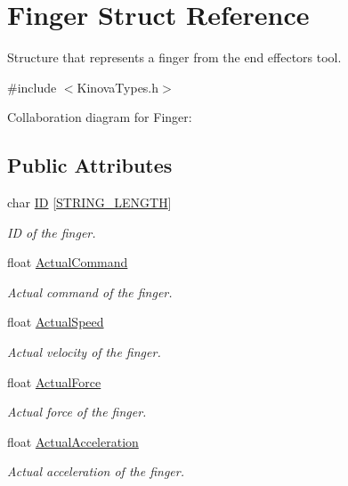 \hypertarget{struct_finger}{}\section{Finger Struct Reference}
\label{struct_finger}


Structure that represents a finger from the end effector\textquotesingle{}s tool.  




{\ttfamily \#include $<$Kinova\+Types.\+h$>$}



Collaboration diagram for Finger\+:
\subsection*{Public Attributes}
\begin{DoxyCompactItemize}
\item 
char \hyperlink{struct_finger_a1e81ad463f71627970a8e6820f789fab}{ID} \mbox{[}\hyperlink{_kinova_types_8h_ac829415013d8120cedee928452ae0f55}{S\+T\+R\+I\+N\+G\+\_\+\+L\+E\+N\+G\+TH}\mbox{]}
\begin{DoxyCompactList}\small\item\em ID of the finger. \end{DoxyCompactList}\item 
float \hyperlink{struct_finger_a901a1c88ba688a7880e9070db8fee548}{Actual\+Command}
\begin{DoxyCompactList}\small\item\em Actual command of the finger. \end{DoxyCompactList}\item 
float \hyperlink{struct_finger_aa934199555a980635f9ddc574cc6dd84}{Actual\+Speed}
\begin{DoxyCompactList}\small\item\em Actual velocity of the finger. \end{DoxyCompactList}\item 
float \hyperlink{struct_finger_aeedf954fed8b85b6cfc6804c6533a428}{Actual\+Force}
\begin{DoxyCompactList}\small\item\em Actual force of the finger. \end{DoxyCompactList}\item 
float \hyperlink{struct_finger_a8f567a1b4f79cc476c293e231f4a640c}{Actual\+Acceleration}
\begin{DoxyCompactList}\small\item\em Actual acceleration of the finger. \end{DoxyCompactList}\item 

\end{DoxyCompactItemize}

